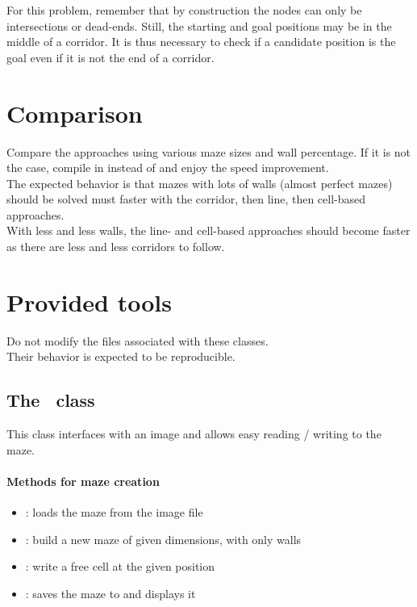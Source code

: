 \documentclass{ecnreport}
\def\maze{\okt{ecn::Maze}~}
\begin{document}
For this problem, remember that by construction the nodes can only be intersections or dead-ends. Still, the starting and goal positions may 
be in the middle of a corridor. It is thus necessary to check if a candidate position is the goal even if it is not the end of a corridor.

\section{Comparison}

Compare the approaches using various maze sizes and wall percentage.
If it is not the case, compile in  instead of  and enjoy the speed improvement.\\

The expected behavior is that mazes with lots of walls (almost perfect mazes) should be solved must faster with the corridor, then line, then cell-based approaches.\\
With less and less walls, the line- and cell-based approaches should become faster as there are less and less corridors to follow.

\appendix

\section{Provided tools}

Do not modify the files associated with these classes.\\Their behavior is expected to be reproducible.

\subsection{The \maze class}\label{mazeClass}

This class interfaces with an image and allows easy reading / writing to the maze. 

\paragraph{Methods for maze creation}
\begin{itemize}
 \item {}: loads the maze from the image file
 \item {}: build a new maze of given dimensions, with only walls
 \item {}: write a free cell at the given position
 \item {}: saves the maze to  and displays it
\end{itemize}
\end{document}

